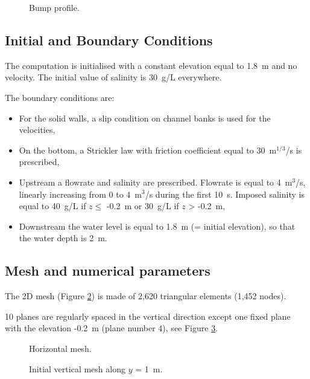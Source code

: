 \begin{figure}[!htbp]
 \centering
 \caption{Bump profile.}
 \label{t3d:tetra:fig:Profil}
\end{figure}

\subsection{Initial and Boundary Conditions}

The computation is initialised with a constant elevation equal to 1.8~m
and no velocity.
The initial value of salinity is 30~g/L everywhere.

The boundary conditions are:
\begin{itemize}
\item For the solid walls, a slip condition on channel banks is used for the
velocities,
\item On the bottom, a Strickler law with friction coefficient equal to
30~m$^{1/3}$/s is prescribed,
\item Upstream a flowrate and salinity are prescribed.
Flowrate is equal to 4~m$^3$/s, linearly increasing from 0 to 4~m$^3$/s during
the first 10~s.
Imposed salinity is equal to 40~g/L if $z \leq$ -0.2~m or 30~g/L if $z$ > -0.2~m,
\item Downstream the water level is equal to 1.8~m (= initial elevation),
so that the water depth is 2~m.
\end{itemize}

\subsection{Mesh and numerical parameters}

The 2D mesh (Figure \ref{t3d:tetra:fig:meshH})
is made of 2,620 triangular elements (1,452 nodes).

10 planes are regularly spaced in the vertical direction except one fixed
plane with the elevation -0.2~m (plane number 4),
see Figure \ref{t3d:tetra:fig:meshV}.

\begin{figure}[!htbp]
 \centering
 \caption{Horizontal mesh.}
 \label{t3d:tetra:fig:meshH}
\end{figure}

\begin{figure}[!htbp]
 \centering
 \caption{Initial vertical mesh along $y$ = 1~m.}
 \label{t3d:tetra:fig:meshV}
\end{figure}

